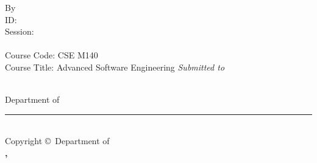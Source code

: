 \begin{titlepage}
    \linespread{1.75}
    \begin{center}
        \large
        {\Huge\textbf{\thesistitle}}
        \ifdefined\ARCTHIRDCOPY
            \vfill By \vfill
            \textbf{\MakeUppercase{\myname}} \\ ID: \mystdid \\ Session: \mysession \\ \textbf{\itshape \mydegree}
            \\ Course Code: CSE M140 \\ Course Title: Advanced Software Engineering
            \vfill {} \vfill
            {\itshape\Large Submitted to} \\
            {\textbf{\supervisorname}} \\ \supdesignation \vfill
        \else
            \vfill {} \vfill
        \fi

        \vfill Department of {\textbf{\deptname \\
        \institutename}} \vfill
        \noindent\rule{\textwidth}{1pt} \\
        Copyright \copyright \ Department of \\
        \textbf{\deptname, \institutename} \\ \mydate
    \end{center}
    \restoregeometry
\end{titlepage}

